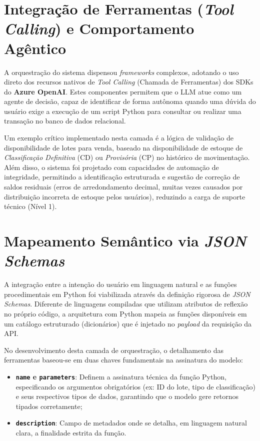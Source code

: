 \section{Integração de Ferramentas (\textit{Tool Calling}) e Comportamento Agêntico}

A orquestração do sistema dispensou \textit{frameworks} complexos, adotando o uso direto dos recursos nativos de \textit{Tool Calling} (Chamada de Ferramentas) dos SDKs do \textbf{Azure OpenAI}. Estes componentes permitem que o LLM atue como um agente de decisão, capaz de identificar de forma autônoma quando uma dúvida do usuário exige a execução de um script Python para consultar ou realizar uma transação no banco de dados relacional. 

Um exemplo crítico implementado nesta camada é a lógica de validação de disponibilidade de lotes para venda, baseado na disponibilidade de estoque de \textit{Classificação Definitiva} (CD) ou \textit{Provisória} (CP) no histórico de movimentação. Além disso, o sistema foi projetado com capacidades de automação de integridade, permitindo a identificação estruturada e sugestão de correção de saldos residuais (erros de arredondamento decimal, muitas vezes causados por distribuição incorreta de estoque pelos usuários), reduzindo a carga de suporte técnico (Nível 1).

\section{Mapeamento Semântico via \textit{JSON Schemas}}

A integração entre a intenção do usuário em linguagem natural e as funções procedimentais em Python foi viabilizada através da definição rigorosa de \textit{JSON Schemas}. Diferente de linguagens compiladas que utilizam atributos de reflexão no próprio código, a arquitetura com Python mapeia as funções disponíveis em um catálogo estruturado (dicionários) que é injetado no \textit{payload} da requisição da API.

No desenvolvimento desta camada de orquestração, o detalhamento das ferramentas baseou-se em duas chaves fundamentais na assinatura do modelo:
\begin{itemize}
    \item \textbf{\texttt{name} e \texttt{parameters}}: Definem a assinatura técnica da função Python, especificando os argumentos obrigatórios (ex: ID do lote, tipo de classificação) e seus respectivos tipos de dados, garantindo que o modelo gere retornos tipados corretamente;
    \item \textbf{\texttt{description}}: Campo de metadados onde se detalha, em linguagem natural clara, a finalidade estrita da função. 
\end{itemize}

